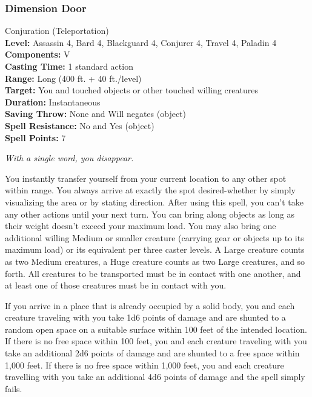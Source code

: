 \subsubsection{Dimension Door}
\label{Spell:DimensionDoor}
Conjuration (Teleportation)
\\ \textbf{Level:} Assassin 4, Bard 4, Blackguard 4, Conjurer 4, Travel 4, Paladin 4
\\ \textbf{Components:} V
\\ \textbf{Casting Time:} 1 standard action
\\ \textbf{Range:} Long (400 ft. + 40 ft./level)
\\ \textbf{Target:} You and touched objects or other touched willing creatures
\\ \textbf{Duration:} Instantaneous
\\ \textbf{Saving Throw:} None and Will negates (object)
\\ \textbf{Spell Resistance:} No and Yes (object)
\\ \textbf{Spell Points:} 7

\emph{With a single word, you disappear.}

You instantly transfer yourself from your current location to any other spot within range.
You always arrive at exactly the spot desired-whether by simply visualizing the area or by stating direction. 
After using this spell, you can't take any other actions until your next turn. 
You can bring along objects as long as their weight doesn't exceed your maximum load. 
You may also bring one additional willing Medium or smaller creature (carrying gear or objects up to its maximum load) 
or its equivalent per three caster levels. 
A Large creature counts as two Medium creatures, a Huge creature counts as two Large creatures, and so forth. 
All creatures to be transported must be in contact with one another, 
and at least one of those creatures must be in contact with you.

If you arrive in a place that is already occupied by a solid body, 
you and each creature traveling with you take 1d6 points of damage and 
are shunted to a random open space on a suitable surface within 100 feet of the intended location.
If there is no free space within 100 feet, you and each creature traveling with you take an additional 
2d6 points of damage and are shunted to a free space within 1,000 feet. 
If there is no free space within 1,000 feet, 
you and each creature travelling with you take an additional 4d6 points of damage and the spell simply fails.

